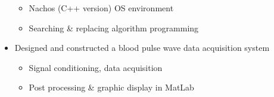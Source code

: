\documentclass[a4paper, 12pt]{article}
\newenvironment{changemargin}[2]{%
  \begin{list}{}{%
      \setlength{\topsep}{0pt}%
      \setlength{\leftmargin}{#1}%
      \setlength{\rightmargin}{#2}%
      \setlength{\listparindent}{\parindent}%
      \setlength{\itemindent}{\parindent}%
      \setlength{\parsep}{\parskip}%
    }%
  \item[]}{\end{list}
}
\newcommand{\lineover}{
  \begin{changemargin}{-0.05in}{-0.05in}
    \vspace*{-8pt}
    \hrulefill \\
    \vspace*{-2pt}
  \end{changemargin}
}
\newcommand{\header}[1]{
  \begin{changemargin}{-0.5in}{-0.5in}
    \scshape{#1}\\
    \lineover
  \end{changemargin}
}
\newenvironment{body}
{
\vspace*{-16pt}
\begin{changemargin}{-0.25in}{-0.5in}
}	
{
\end{changemargin}
}
\begin{document}
\begin{body}
\begin{itemize}
    \begin{itemize} \itemsep -0pt \small
        \item Nachos (C++ version) OS environment
        \item Searching \& replacing algorithm programming
    \end{itemize}
  \item Designed and constructed a blood pulse wave data acquisition system
    \begin{itemize} \itemsep -0pt \small
        \item Signal conditioning, data acquisition
        \item Post processing \& graphic display in MatLab
    \end{itemize}
  \end{itemize}
\end{body}

% 
% 
%
%
\end{document}
